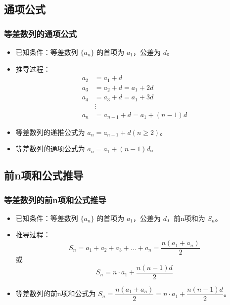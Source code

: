 \documentclass{ctexbeamer}
\begin{document}
\subsection{通项公式}
\begin{frame}
\frametitle{等差数列的通项公式}
\begin{itemize}
    \item 已知条件：等差数列 $\{a_n\}$ 的首项为 $a_1$，公差为 $d$。
    \item 推导过程：
        \begin{align*}
            a_2 &= a_1 + d \\
            a_3 &= a_2 + d = a_1 + 2d \\
            a_4 &= a_3 + d = a_1 + 3d \\
            &\vdots \\
            a_n &= a_{n-1} + d = a_1 + (n - 1)d
        \end{align*}
    \item 等差数列的递推公式为 $a_n = a_{n-1} + d (n \geq 2) $。
    \item 等差数列的通项公式为 $a_n = a_1 + (n - 1)d$。
\end{itemize}
\end{frame}

\subsection{前n项和公式推导}
\begin{frame}
\frametitle{等差数列的前n项和公式推导}
\begin{itemize}
    \item 已知条件：等差数列 $\{a_n\}$ 的首项为 $a_1$，公差为 $d$，前n项和为 $S_n$。
    \item 推导过程：
        \[
            S_n = a_1 + a_2 + a_3 + \ldots + a_n = \frac{n(a_1 + a_n)}{2}
        \]
        或
        \[
            S_n = n \cdot a_1 + \dfrac{n(n - 1)d}{2}
        \]
    \item 等差数列的前n项和公式为 $S_n = \dfrac{n(a_1 + a_n)}{2} = n \cdot a_1 + \dfrac{n(n - 1)d}{2}$。
\end{itemize}
\end{frame}
\end{document}
